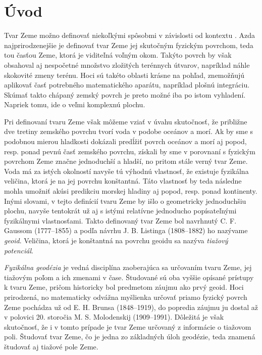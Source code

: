 \documentclass[a4paper, 12pt]{book}
\begin{document}
\tableofcontents
\newpage







\chapter*{Úvod}

Tvar Zeme možno definovať niekoľkými spôsobmi v závislosti od kontextu 
\citep{MoritzTheFigureOfTheEarth}.  Azda najprirodzenejšie je definovať tvar 
Zeme jej skutočným fyzickým povrchom, teda tou časťou Zeme, ktorá je viditeľná 
voľným okom.  Takýto povrch by však obsahoval aj nespočetné množstvo zložitých 
terénnych útvarov, napríklad náhle skokovité zmeny terénu.  Hoci sú takéto 
oblasti krásne na pohľad, znemožňujú aplikovať časť potrebného matematického 
aparátu, napríklad plošnú integráciu.  Skúmať takto chápaný zemský povrch je 
preto možné iba po istom vyhladení.  Napriek tomu, ide o veľmi komplexnú 
plochu.

Pri definovaní tvaru Zeme však môžeme vziať v úvahu skutočnosť, že približne 
dve tretiny zemského povrchu tvorí voda v podobe oceánov a morí.  Ak by sme 
s podobnou mierou hladkosti dokázali predĺžiť povrch oceánov a morí aj popod, 
resp. ponad pevnú časť zemského povrchu, získali by sme v porovnaní s fyzickým 
povrchom Zeme značne jednoduchší a hladší, no pritom stále verný tvar Zeme.  
Voda má za istých okolností navyše tú výhodnú vlastnosť, že existuje fyzikálna 
veličina, ktorá je na jej povrchu konštantná.  Táto vlastnosť by teda následne 
mohla umožniť akúsi predikciu morskej hladiny aj popod, resp. ponad kontinenty.  
Inými slovami, v tejto definícií tvaru Zeme by išlo o geometricky jednoduchšiu 
plochu, navyše tentokrát už aj s istými relatívne jednoducho popísateľnými 
fyzikálnymi vlastnosťami.  Takto definovaný tvar Zeme bol navrhnutý 
C. F. Gaussom (1777--1855) a podľa návrhu J. B. Listinga (1808--1882) ho 
nazývame \emph{geoid}.  Veličina, ktorá je konštantná na povrchu geoidu sa 
nazýva \emph{tiažový potenciál}.

\emph{Fyzikálna geodézia} je vedná disciplína zaoberajúca sa určovaním tvaru 
Zeme, jej tiažovým poľom a ich zmenami v čase.  Študované sú oba vyššie opísané 
prístupy k tvaru Zeme, pričom historicky bol predmetom záujmu ako prvý geoid.  
Hoci prirodzená, no matematicky odvážna myšlienka určovať priamo fyzický povrch 
Zeme pochádza už od E. H. Brunsa (1848--1919), do popredia záujmu ju dostal až 
v polovici 20. storočia M. S. Molodenskij (1909--1991).  Dôležitá je však 
skutočnosť, že i v tomto prípade je tvar Zeme určovaný z informácie o tiažovom 
poli.  Študovať tvar Zeme, čo je jedna zo základných úloh geodézie, teda 
znamená študovať aj tiažové pole Zeme.
\end{document}
